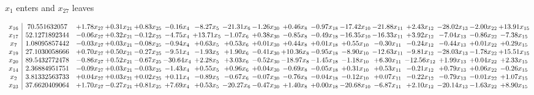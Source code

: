 \documentclass[9pt]{article}
\begin{document}
 $ x_{1} $ enters and $ x_{27} $ leaves 

 \[\begin{array}{c| c c@{\hskip 2pt} c@{\hskip 2pt} c@{\hskip 2pt} c@{\hskip 2pt} c@{\hskip 2pt} c@{\hskip 2pt} c@{\hskip 2pt} c@{\hskip 2pt} c@{\hskip 2pt} c@{\hskip 2pt} c@{\hskip 2pt} c@{\hskip 2pt} c@{\hskip 2pt} c@{\hskip 2pt} c@{\hskip 2pt} }
 x_{16}   &  70.551632057 & +  1.78 x_{27} & +  0.31 x_{21} & +  0.83 x_{25} & -0.16 x_{4} & -8.27 x_{5} & -21.31 x_{6} & -1.26 x_{30} & +  0.46 x_{8} & -0.97 x_{18} & -17.42 x_{10} & -21.88 x_{11} & +  2.43 x_{12} & -28.02 x_{13} & -2.00 x_{22} & + 13.91 x_{15}\\
 x_{17}   &  52.1271892344 & -0.06 x_{27} & +  0.32 x_{21} & -0.12 x_{25} & -4.75 x_{4} & + 13.71 x_{5} & -1.07 x_{6} & +  0.38 x_{30} & -0.85 x_{8} & -0.49 x_{18} & -16.35 x_{10} & -16.33 x_{11} & +  3.92 x_{12} & -7.04 x_{13} & -0.86 x_{22} & -7.38 x_{15}\\
 x_{7}   &  1.08095857442 & -0.03 x_{27} & +  0.03 x_{21} & -0.08 x_{25} & -0.94 x_{4} & +  0.63 x_{5} & +  0.53 x_{6} & +  0.01 x_{30} & +  0.44 x_{8} & +  0.01 x_{18} & +  0.55 x_{10} & -0.30 x_{11} & -0.24 x_{12} & -0.44 x_{13} & +  0.01 x_{22} & +  0.29 x_{15}\\
 x_{19}   &  27.1030058666 & +  0.70 x_{27} & +  0.50 x_{21} & -0.27 x_{25} & -9.51 x_{4} & -1.93 x_{5} & +  1.90 x_{6} & -0.41 x_{30} & + 10.36 x_{8} & -0.95 x_{18} & -8.90 x_{10} & -12.63 x_{11} & -9.81 x_{12} & -28.03 x_{13} & -1.78 x_{22} & + 15.51 x_{15}\\
 x_{20}   &  89.5432772478 & -0.86 x_{27} & +  0.52 x_{21} & -0.67 x_{25} & -30.64 x_{4} & +  2.28 x_{5} & +  3.03 x_{6} & -0.52 x_{30} & -18.97 x_{8} & -1.45 x_{18} & -1.18 x_{10} & +  6.30 x_{11} & -12.56 x_{12} & +  1.99 x_{13} & +  0.04 x_{22} & +  2.33 x_{15}\\
 x_{14}   &  2.36884951751 & -0.09 x_{27} & +  0.03 x_{21} & -0.03 x_{25} & -1.43 x_{4} & +  0.55 x_{5} & +  0.96 x_{6} & +  0.04 x_{30} & -0.69 x_{8} & -0.05 x_{18} & +  0.31 x_{10} & +  0.53 x_{11} & -0.21 x_{12} & +  0.79 x_{13} & +  0.06 x_{22} & -0.26 x_{15}\\
 x_{2}   &  3.81332563733 & +  0.04 x_{27} & +  0.03 x_{21} & +  0.02 x_{25} & +  0.11 x_{4} & -0.89 x_{5} & -0.67 x_{6} & -0.07 x_{30} & -0.76 x_{8} & -0.04 x_{18} & -0.12 x_{10} & +  0.07 x_{11} & -0.22 x_{12} & -0.79 x_{13} & -0.01 x_{22} & +  1.07 x_{15}\\
 x_{23}   &  37.6620409064 & +  1.70 x_{27} & -0.27 x_{21} & +  0.81 x_{25} & +  7.69 x_{4} & +  0.53 x_{5} & -20.27 x_{6} & -0.47 x_{30} & +  1.40 x_{8} & +  0.00 x_{18} & -20.68 x_{10} & -6.87 x_{11} & +  2.10 x_{12} & -20.14 x_{13} & -1.63 x_{22} & +  8.90 x_{15}\\

\end{array}\]
\end{document}
